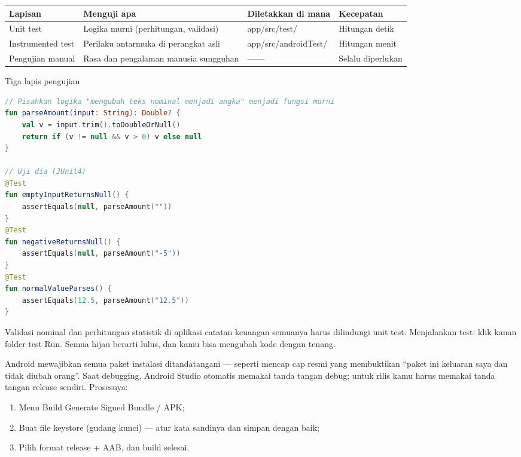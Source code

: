 \begin{center}
\begin{tabularx}{\linewidth}{|X|X|X|X|}
\hline
\textbf{Lapisan} & \textbf{Menguji apa} & \textbf{Diletakkan di mana} & \textbf{Kecepatan} \tabularnewline
\hline
Unit test & Logika murni (perhitungan, validasi) & app/src/test/ & Hitungan detik \tabularnewline
Instrumented test & Perilaku antarmuka di perangkat asli & app/src/androidTest/ & Hitungan menit \tabularnewline
Pengujian manual & Rasa dan pengalaman manusia sungguhan & —— & Selalu diperlukan \tabularnewline
\hline
\end{tabularx}
\end{center}

\begin{center}\small\color{gray}Tiga lapis pengujian\end{center}

\begin{lstlisting}[language=Kotlin]
// Pisahkan logika "mengubah teks nominal menjadi angka" menjadi fungsi murni
fun parseAmount(input: String): Double? {
    val v = input.trim().toDoubleOrNull()
    return if (v != null && v > 0) v else null
}

// Uji dia (JUnit4)
@Test
fun emptyInputReturnsNull() {
    assertEquals(null, parseAmount(""))
}
@Test
fun negativeReturnsNull() {
    assertEquals(null, parseAmount("-5"))
}
@Test
fun normalValueParses() {
    assertEquals(12.5, parseAmount("12.5"))
}
\end{lstlisting}

Validasi nominal dan perhitungan statistik di aplikasi catatan keuangan semuanya harus dilindungi unit test. Menjalankan test: klik kanan folder test Run. Semua hijau berarti lulus, dan kamu bisa mengubah kode dengan tenang.


Android mewajibkan semua paket instalasi ditandatangani — seperti mencap cap resmi yang membuktikan “paket ini keluaran saya dan tidak diubah orang”. Saat debugging, Android Studio otomatis memakai tanda tangan debug; untuk rilis kamu harus memakai tanda tangan release sendiri. Prosesnya:

\begin{enumerate}
  \item Menu Build Generate Signed Bundle / APK;
  \item Buat file keystore (gudang kunci) — atur kata sandinya dan simpan dengan baik;
  \item Pilih format release + AAB, dan build selesai.
\end{enumerate}

